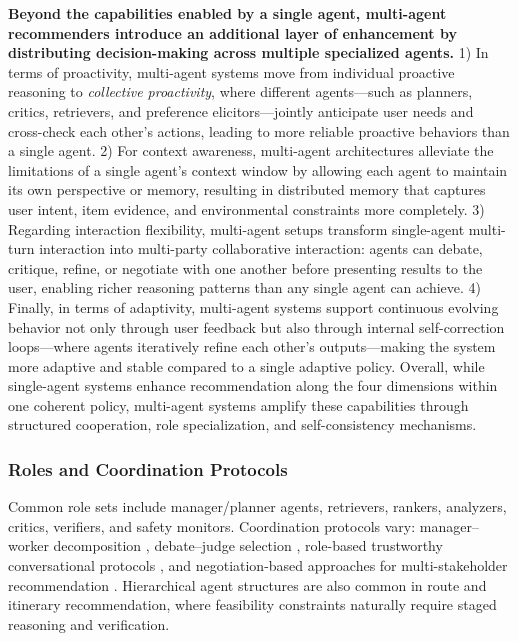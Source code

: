 \textbf{Beyond the capabilities enabled by a single agent, multi-agent recommenders introduce an additional layer of enhancement by distributing decision-making across multiple specialized agents.} 
1) In terms of proactivity, multi-agent systems move from individual proactive reasoning to \textit{collective proactivity}, where different agents—such as planners, critics, retrievers, and preference elicitors—jointly anticipate user needs and cross-check each other’s actions, leading to more reliable proactive behaviors than a single agent. 
2) For context awareness, multi-agent architectures alleviate the limitations of a single agent’s context window by allowing each agent to maintain its own perspective or memory, resulting in distributed memory that captures user intent, item evidence, and environmental constraints more completely. 
3) Regarding interaction flexibility, multi-agent setups transform single-agent multi-turn interaction into multi-party collaborative interaction: agents can debate, critique, refine, or negotiate with one another before presenting results to the user, enabling richer reasoning patterns than any single agent can achieve. 
4) Finally, in terms of adaptivity, multi-agent systems support continuous evolving behavior not only through user feedback but also through internal self-correction loops—where agents iteratively refine each other’s outputs—making the system more adaptive and stable compared to a single adaptive policy. 
Overall, while single-agent systems enhance recommendation along the four dimensions within one coherent policy, multi-agent systems amplify these capabilities through structured cooperation, role specialization, and self-consistency mechanisms.

\subsubsection{\textbf{Roles and Coordination Protocols}}\label{subsubsec:agent_rec_coordination}
Common role sets include manager/planner agents, retrievers, rankers, analyzers, critics, verifiers, and safety monitors. Coordination protocols vary: manager--worker decomposition \cite{wang2024macrec, xia2026multi, zhang2026llms,nie2024hybrid,portugal2024agentic,agarwal2024multistage}, debate--judge selection \cite{fang2024multi,ma2025agentrec}, role-based trustworthy conversational protocols \cite{hui2025matcha}, and negotiation-based approaches for multi-stakeholder recommendation \cite{banerjee2025collab, dixit2026pcn}. Hierarchical agent structures are also common in route and itinerary recommendation, where feasibility constraints naturally require staged reasoning and verification.

